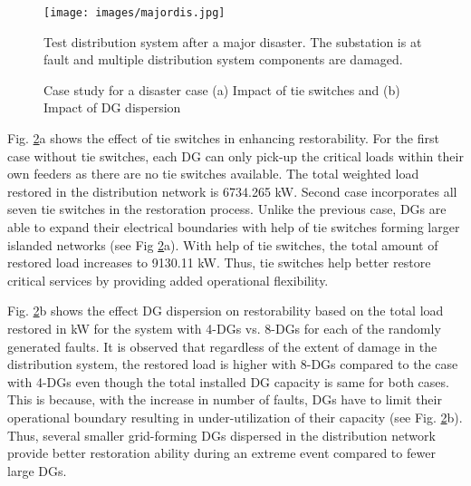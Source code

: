 \documentclass[12pt]{article}
\begin{document}
\begin{figure}[t]
    \centering
    \texttt{[image: images/majordis.jpg]}
        \vspace{-0.3 cm}
    \caption{Test distribution system after a major disaster. The substation is at fault and multiple distribution system components are damaged.}
    \label{fig:dis}
    \vspace{-0.2cm}
\end{figure}
\begin{figure}[h]%
    \centering
    \qquad
    \caption{Case study for a disaster case (a) Impact of tie switches and (b) Impact of DG dispersion}%
    \label{fig:disres}%
\end{figure}

Fig. \ref{fig:disres}a shows the effect of tie switches in enhancing restorability. For the first case without tie switches, each DG can only pick-up the critical loads within their own feeders as there are no tie switches available. The total weighted load restored in the distribution network is 6734.265 kW. Second case incorporates all seven tie switches in the restoration process. Unlike the previous case, DGs are able to expand their electrical boundaries with help of tie switches forming larger islanded networks (see Fig \ref{fig:disres}a). 
With help of tie switches, the total amount of restored load increases to 9130.11 kW. Thus, tie switches help better restore critical services by providing added operational flexibility.

Fig. \ref{fig:disres}b shows the effect DG dispersion on restorability based on the total load restored in kW for the system with 4-DGs vs. 8-DGs for each of the randomly generated faults. It is observed that regardless of the extent of damage in the distribution system, the restored load is higher with 8-DGs compared to the case with 4-DGs even though the total installed DG capacity is same for both cases. This is because, with the increase in number of faults, DGs have to limit their operational boundary resulting in under-utilization of their capacity (see Fig. \ref{fig:disres}b). Thus, several smaller grid-forming DGs dispersed in the distribution network provide better restoration ability during an extreme event compared to fewer large DGs.
\end{document}
